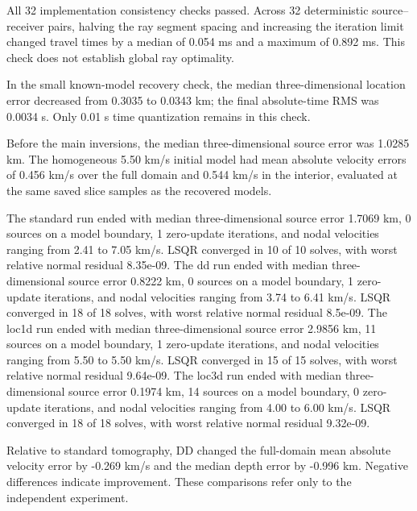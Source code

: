 All 32 implementation consistency checks passed. Across 32 deterministic source--receiver pairs, halving the ray segment spacing and increasing the iteration limit changed travel times by a median of 0.054 ms and a maximum of 0.892 ms. This check does not establish global ray optimality.

In the small known-model recovery check, the median three-dimensional location error decreased from 0.3035 to 0.0343 km; the final absolute-time RMS was 0.0034 s. Only 0.01 s time quantization remains in this check.

Before the main inversions, the median three-dimensional source error was 1.0285 km. The homogeneous 5.50 km/s initial model had mean absolute velocity errors of 0.456 km/s over the full domain and 0.544 km/s in the interior, evaluated at the same saved slice samples as the recovered models.

The standard run ended with median three-dimensional source error 1.7069 km, 0 sources on a model boundary, 1 zero-update iterations, and nodal velocities ranging from 2.41 to 7.05 km/s. LSQR converged in 10 of 10 solves, with worst relative normal residual 8.35e-09.
The dd run ended with median three-dimensional source error 0.8222 km, 0 sources on a model boundary, 1 zero-update iterations, and nodal velocities ranging from 3.74 to 6.41 km/s. LSQR converged in 18 of 18 solves, with worst relative normal residual 8.5e-09.
The loc1d run ended with median three-dimensional source error 2.9856 km, 11 sources on a model boundary, 1 zero-update iterations, and nodal velocities ranging from 5.50 to 5.50 km/s. LSQR converged in 15 of 15 solves, with worst relative normal residual 9.64e-09.
The loc3d run ended with median three-dimensional source error 0.1974 km, 14 sources on a model boundary, 0 zero-update iterations, and nodal velocities ranging from 4.00 to 6.00 km/s. LSQR converged in 18 of 18 solves, with worst relative normal residual 9.32e-09.


Relative to standard tomography, DD changed the full-domain mean absolute velocity error by -0.269 km/s and the median depth error by -0.996 km. Negative differences indicate improvement. These comparisons refer only to the independent experiment.
